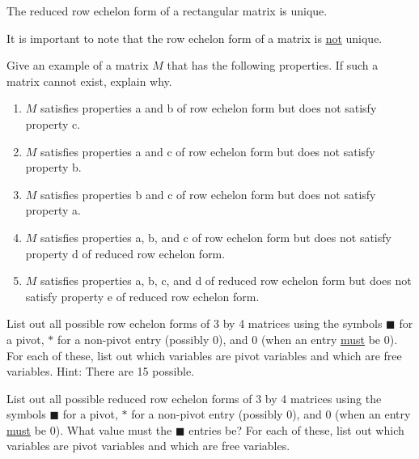 \begin{theorem} The reduced row echelon form of a rectangular matrix is unique.
\end{theorem}
It is important to note that the row echelon form of a matrix is \underline{not} unique.
\begin{question} Give an example of a matrix $M$ that has the following properties. If such a matrix cannot exist, explain why.
\begin{enumerate}
\item $M$ satisfies properties a and b of row echelon form but does not satisfy property c.
\item $M$ satisfies properties a and c of row echelon form but does not satisfy property b.
\item $M$ satisfies properties b and c of row echelon form but does not satisfy property a.
\item $M$ satisfies properties a, b, and c of row echelon form but does not satisfy property d of reduced row echelon form.
\item $M$ satisfies properties a, b, c, and d of reduced row echelon form but does not satisfy property e of reduced row echelon form.
\end{enumerate}
\end{question}

\begin{question}\label{q5} List out all possible row echelon forms of 3 by 4 matrices using the symbols $\blacksquare$ for a pivot, $*$ for a non-pivot entry (possibly $0$), and $0$ (when an entry \underline{must} be $0$). For each of these, list out which variables are pivot variables and which are free variables. Hint: There are 15 possible.
\end{question}

\begin{question} List out all possible reduced row echelon forms of 3 by 4 matrices using the symbols $\blacksquare$ for a pivot, $*$ for a non-pivot entry (possibly $0$), and $0$ (when an entry \underline{must} be $0$). What value must the $\blacksquare$ entries be? For each of these, list out which variables are pivot variables and which are free variables.
\end{question}

